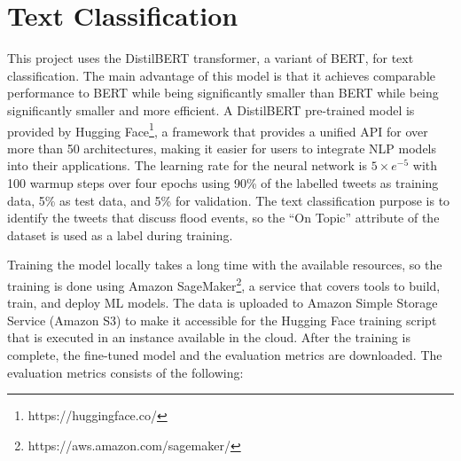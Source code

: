 \section{Text Classification}

This project uses the DistilBERT transformer\cite{Sanh2019DistilBERTAD}, a variant of \ac{BERT}, for text
classification.  The main advantage of this model is that it achieves comparable performance to BERT
while being significantly smaller than BERT while being significantly smaller and more efficient. A
DistilBERT pre-trained model is provided by Hugging Face\footnote{https://huggingface.co/}, a
framework that provides a unified API for over more than 50 architectures, making it easier for
users to integrate \ac{NLP} models into their applications. The learning rate for the neural network
is $5\times e^{-5}$ with 100 warmup steps over four epochs using 90\% of the labelled tweets as
training data, 5\% as test data, and 5\% for validation. The text classification purpose is to
identify the tweets that discuss flood events, so the ``On Topic'' attribute of the dataset is used
as a label during training. 

Training the model locally takes a long time with the available resources, so the training is done
using Amazon SageMaker\footnote{https://aws.amazon.com/sagemaker/}, a service that covers tools to
build, train, and deploy \ac{ML} models. The data is uploaded to Amazon Simple Storage Service
(Amazon S3) to make it accessible for the Hugging Face training script that is executed in an
instance available in the cloud. After the training is complete, the fine-tuned model and the
evaluation metrics are downloaded. The evaluation metrics consists of the following:


